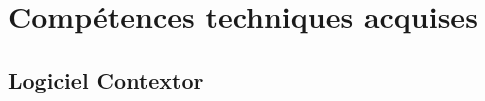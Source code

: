 \documentclass[a4paper,twoside,12pt]{report}
\begin{document}
\chapter{Compétences techniques acquises}
\section{Logiciel Contextor}
\end{document}
